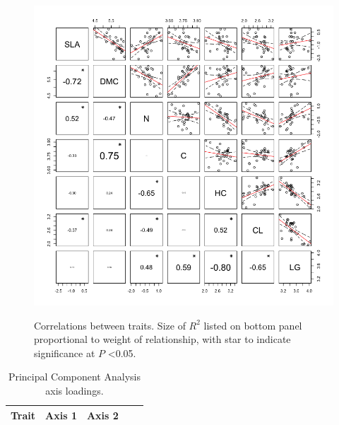 \documentclass{article}
\begin{document}
\begin{figure}
	\scalebox{0.5}
	{\includegraphics{figs/pairplot.png}}
	\caption{Correlations between traits. Size of $R^2$ listed on bottom panel proportional to weight of relationship, with star to indicate significance at $P$ \textless 0.05.}
	\label{Fig:pairplot}
\end{figure}

\begin{table}[!htbp]\centering
	\caption{Principal Component Analysis axis loadings.}
	\label{Tab:pca}
	\begin{tabular}{l r r r r}
        		\toprule
        		Trait & Axis 1 & Axis 2 \\
        		\midrule  
		
        		\bottomrule
	\end{tabular}
\end{table}
\end{document}
